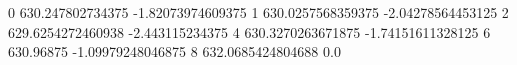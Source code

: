0 630.247802734375 -1.82073974609375
1 630.0257568359375 -2.04278564453125
2 629.6254272460938 -2.443115234375
4 630.3270263671875 -1.74151611328125
6 630.96875 -1.09979248046875
8 632.0685424804688 0.0
